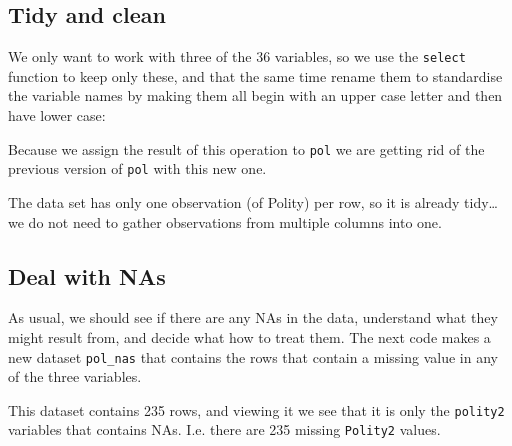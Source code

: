 \documentclass[]{book}
\newenvironment{Shaded}{\begin{snugshade}}{\end{snugshade}}
\newcommand{\DataTypeTok}[1]{\textcolor[rgb]{0.13,0.29,0.53}{#1}}
\newcommand{\KeywordTok}[1]{\textcolor[rgb]{0.13,0.29,0.53}{\textbf{#1}}}
\newcommand{\NormalTok}[1]{#1}
\newcommand{\OperatorTok}[1]{\textcolor[rgb]{0.81,0.36,0.00}{\textbf{#1}}}
\newcommand{\StringTok}[1]{\textcolor[rgb]{0.31,0.60,0.02}{#1}}
\begin{document}
\hypertarget{tidy-and-clean}{%
\subsection{Tidy and clean}\label{tidy-and-clean}}

We only want to work with three of the 36 variables, so we use the \texttt{select} function to keep only these, and that the same time rename them to standardise the variable names by making them all begin with an upper case letter and then have lower case:

\begin{Shaded}
\end{Shaded}

Because we assign the result of this operation to \texttt{pol} we are getting rid of the previous version of \texttt{pol} with this new one.

The data set has only one observation (of Polity) per row, so it is already tidy\ldots{} we do not need to gather observations from multiple columns into one.

\hypertarget{deal-with-nas}{%
\subsection{Deal with NAs}\label{deal-with-nas}}

As usual, we should see if there are any NAs in the data, understand what they might result from, and decide what how to treat them. The next code makes a new dataset \texttt{pol\_nas} that contains the rows that contain a missing value in any of the three variables.

\begin{Shaded}
\end{Shaded}

This dataset contains 235 rows, and viewing it we see that it is only the \texttt{polity2} variables that contains NAs. I.e. there are 235 missing \texttt{Polity2} values.
\end{document}
